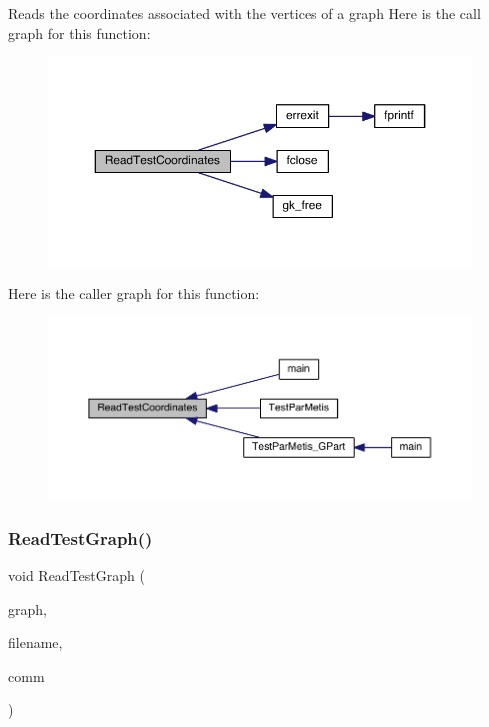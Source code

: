 Reads the coordinates associated with the vertices of a graph Here is the call graph for this function\+:\nopagebreak
\begin{figure}[H]
\begin{center}
\leavevmode
\includegraphics[width=350pt]{a00861_a4c1a88b3f492be37fe35e779692fb84c_cgraph}
\end{center}
\end{figure}
Here is the caller graph for this function\+:\nopagebreak
\begin{figure}[H]
\begin{center}
\leavevmode
\includegraphics[width=350pt]{a00861_a4c1a88b3f492be37fe35e779692fb84c_icgraph}
\end{center}
\end{figure}
\mbox{\label{a00861_a248f280836966f501ed8ecceb1b32a4a}} 
\subsubsection{\texorpdfstring{Read\+Test\+Graph()}{ReadTestGraph()}}
{\footnotesize\ttfamily void Read\+Test\+Graph (\begin{DoxyParamCaption}\item[{\hyperlink{a00734}{graph\+\_\+t} $\ast$}]{graph,  }\item[{char $\ast$}]{filename,  }\item[{M\+P\+I\+\_\+\+Comm}]{comm }\end{DoxyParamCaption})}

